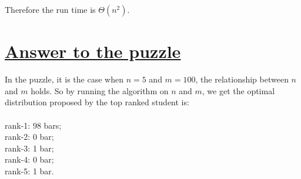 \documentclass[11pt]{article}
\begin{document}
Therefore the run time is $\Theta(n^2)$.

\section*{\underline{Answer to the puzzle}}
In the puzzle, it is the case when $n=5$ and $m=100$, the relationship
between $n$ and $m$ holds. So by running the algorithm on $n$ and $m$,
we get the optimal distribution proposed by the top ranked student is:\\\\
rank-1: 98 bars;\\ rank-2: 0 bar;\\ rank-3: 1 bar;\\ rank-4: 0
bar;\\ rank-5: 1 bar. 
\end{document}
